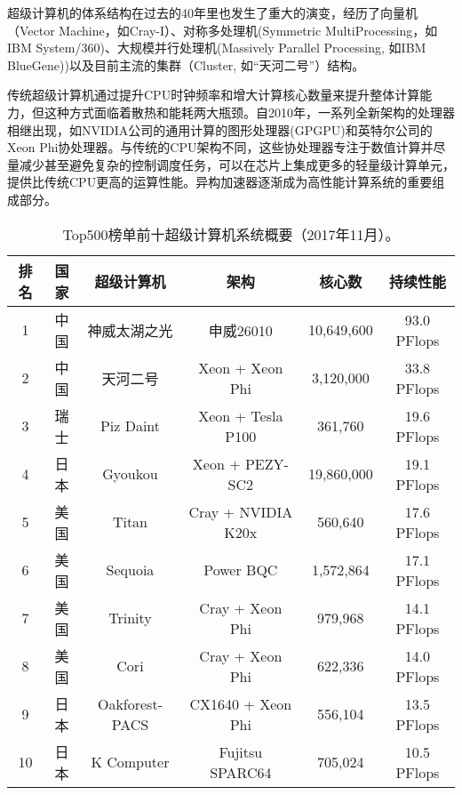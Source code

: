 超级计算机的体系结构在过去的40年里也发生了重大的演变，经历了向量机（Vector Machine，如Cray-I\cite{russell1978cray}）、对称多处理机(Symmetric MultiProcessing，如IBM System/360\cite{anderson1967ibm})、大规模并行处理机(Massively Parallel Processing, 如IBM BlueGene\cite{adiga2002overview}))以及目前主流的集群（Cluster, 如“天河二号”\cite{tianhe-2}）结构。

传统超级计算机通过提升CPU时钟频率和增大计算核心数量来提升整体计算能力，但这种方式面临着散热和能耗两大瓶颈。自2010年，一系列全新架构的处理器相继出现，如NVIDIA公司的通用计算的图形处理器\cite{nvidia2008programming}(GPGPU)和英特尔公司的Xeon Phi协处理器\cite{jeffers2013intel}。与传统的CPU架构不同，这些协处理器专注于数值计算并尽量减少甚至避免复杂的控制调度任务，可以在芯片上集成更多的轻量级计算单元，提供比传统CPU更高的运算性能。异构加速器逐渐成为高性能计算系统的重要组成部分。

\begin{table}[ht]
\centering
\caption{Top500榜单前十超级计算机系统概要（2017年11月）。}
\label{tb:top500}
\begin{tabular}{cccccc}
\hline
排名 & 国家 & 超级计算机     & 架构               & 核心数      & 持续性能        \\ \hline
1  & 中国 & 神威太湖之光     & 申威26010          & 10,649,600 & 93.0 PFlops \\ \hline
2  & 中国 & 天河二号        & Xeon + Xeon Phi    & 3,120,000  & 33.8 PFlops \\ \hline
3  & 瑞士 & Piz Daint      & Xeon + Tesla P100  & 361,760    & 19.6 PFlops \\ \hline
4  & 日本 & Gyoukou        & Xeon + PEZY-SC2    & 19,860,000 & 19.1 PFlops \\ \hline
5  & 美国 & Titan          & Cray + NVIDIA K20x & 560,640    & 17.6 PFlops \\ \hline
6  & 美国 & Sequoia        & Power BQC          & 1,572,864  & 17.1 PFlops \\ \hline
7  & 美国 & Trinity        & Cray + Xeon Phi    & 979,968    & 14.1 PFlops \\ \hline
8  & 美国 & Cori           & Cray + Xeon Phi    & 622,336    & 14.0 PFlops \\ \hline
9  & 日本 & Oakforest-PACS & CX1640 + Xeon Phi  & 556,104    & 13.5 PFlops \\ \hline
10 & 日本 & K Computer     & Fujitsu SPARC64     & 705,024    & 10.5 PFlops \\ \hline
\hline
\end{tabular}
\end{table}

